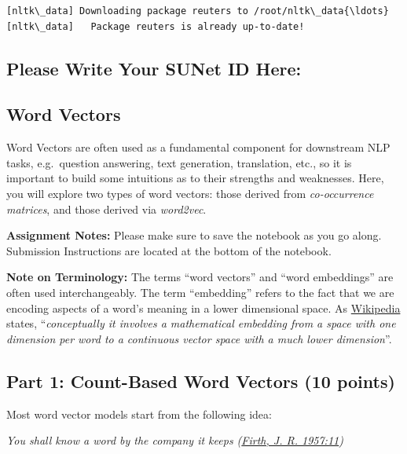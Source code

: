 \documentclass[18pt]{article}
\begin{document}
    \begin{Verbatim}[commandchars=\\\{\}]
[nltk\_data] Downloading package reuters to /root/nltk\_data{\ldots}
[nltk\_data]   Package reuters is already up-to-date!

    \end{Verbatim}

    \hypertarget{please-write-your-sunet-id-here}{%
\subsection{Please Write Your SUNet ID
Here:}\label{please-write-your-sunet-id-here}}

    \hypertarget{word-vectors}{%
\subsection{Word Vectors}\label{word-vectors}}

Word Vectors are often used as a fundamental component for downstream
NLP tasks, e.g.~question answering, text generation, translation, etc.,
so it is important to build some intuitions as to their strengths and
weaknesses. Here, you will explore two types of word vectors: those
derived from \emph{co-occurrence matrices}, and those derived via
\emph{word2vec}.

\textbf{Assignment Notes:} Please make sure to save the notebook as you
go along. Submission Instructions are located at the bottom of the
notebook.

\textbf{Note on Terminology:} The terms ``word vectors'' and ``word
embeddings'' are often used interchangeably. The term ``embedding''
refers to the fact that we are encoding aspects of a word's meaning in a
lower dimensional space. As
\href{https://en.wikipedia.org/wiki/Word_embedding}{Wikipedia} states,
``\emph{conceptually it involves a mathematical embedding from a space
with one dimension per word to a continuous vector space with a much
lower dimension}''.

    \hypertarget{part-1-count-based-word-vectors-10-points}{%
\subsection{Part 1: Count-Based Word Vectors (10
points)}\label{part-1-count-based-word-vectors-10-points}}

Most word vector models start from the following idea:

\emph{You shall know a word by the company it keeps
(\href{https://en.wikipedia.org/wiki/John_Rupert_Firth}{Firth, J. R.
1957:11})}
\end{document}
